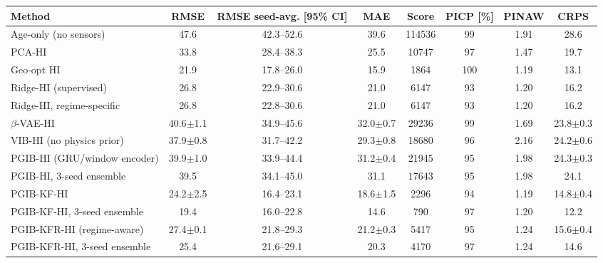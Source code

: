 \setlength{\tabcolsep}{4pt}\begin{tabular}{l c c c c c c c}
\hline
 Method & RMSE & RMSE seed-avg. [95\% CI] & MAE & Score & PICP [\%] & PINAW & CRPS \\
\hline
Age-only (no sensors) & 47.6 & 42.3--52.6 & 39.6 & 114536 & 99 & 1.91 & 28.6 \\
PCA-HI & 33.8 & 28.4--38.3 & 25.5 & 10747 & 97 & 1.47 & 19.7 \\
Geo-opt HI & 21.9 & 17.8--26.0 & 15.9 & 1864 & 100 & 1.19 & 13.1 \\
Ridge-HI (supervised) & 26.8 & 22.9--30.6 & 21.0 & 6147 & 93 & 1.20 & 16.2 \\
Ridge-HI, regime-specific & 26.8 & 22.8--30.6 & 21.0 & 6147 & 93 & 1.20 & 16.2 \\
$\beta$-VAE-HI & 40.6$\pm$1.1 & 34.9--45.6 & 32.0$\pm$0.7 & 29236 & 99 & 1.69 & 23.8$\pm$0.3 \\
VIB-HI (no physics prior) & 37.9$\pm$0.8 & 31.7--42.2 & 29.3$\pm$0.8 & 18680 & 96 & 2.16 & 24.2$\pm$0.6 \\
PGIB-HI (GRU/window encoder) & 39.9$\pm$1.0 & 33.9--44.4 & 31.2$\pm$0.4 & 21945 & 95 & 1.98 & 24.3$\pm$0.3 \\
PGIB-HI, 3-seed ensemble & 39.5 & 34.1--45.0 & 31.1 & 17643 & 95 & 1.98 & 24.1 \\
PGIB-KF-HI & 24.2$\pm$2.5 & 16.4--23.1 & 18.6$\pm$1.5 & 2296 & 94 & 1.19 & 14.8$\pm$0.4 \\
PGIB-KF-HI, 3-seed ensemble & 19.4 & 16.0--22.8 & 14.6 & 790 & 97 & 1.20 & 12.2 \\
PGIB-KFR-HI (regime-aware) & 27.4$\pm$0.1 & 21.8--29.3 & 21.2$\pm$0.3 & 5417 & 95 & 1.24 & 15.6$\pm$0.4 \\
PGIB-KFR-HI, 3-seed ensemble & 25.4 & 21.6--29.1 & 20.3 & 4170 & 97 & 1.24 & 14.6 \\
\hline
\end{tabular}
